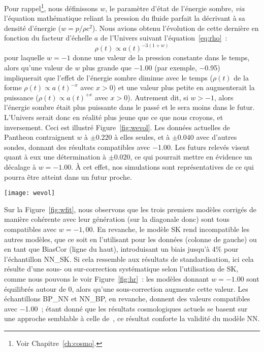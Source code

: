 \documentclass[../main/main.tex]{subfiles}
\begin{document}
Pour rappel\footnote{Voir Chapitre~\ref{ch:cosmo}.}, nous définissons $w$, le
paramètre d'état de l'énergie sombre, \textit{via} l'équation mathématique
reliant la pression du fluide parfait la décrivant à sa densité d'énergie ($w =
p/\rho c^2$). Nous avions obtenu l'évolution de cette dernière en fonction du
facteur d'échelle $a$ de l'Univers suivant l'équation~\ref{eq:rho}~:
\begin{equation}
    \rho(t) \propto a(t)^{-3(1+w)}
\end{equation}
pour laquelle $w = -1$ donne une valeur de la pression constante dans le temps,
alors qu'une valeur de $w$ plus grande que \num{-1.00} (par exemple,
\num{-0.95}) impliquerait que l'effet de l'énergie sombre diminue avec le temps
($\rho(t)$ de la forme $\rho(t) \propto a(t)^{-x}$ avec $x > 0$) et une valeur
plus petite en augmenterait la puissance ($\rho(t) \propto a(t)^{+x}$ avec $x >
0$). Autrement dit, si $w > -1$, alors l'énergie sombre était plus puissante
dans le passé et le sera moins dans le futur. L'Univers serait donc en réalité
plus jeune que ce que nous croyons, et inversement. Ceci est illustré
Figure~\ref{fig:wevol}. Les données actuelles de Pantheon \citep{scolnic2018}
contraignent $w$ à $\pm \num{0.220}$ à elles seules, et à $\pm \num{0.040}$ avec
d'autres sondes, donnant des résultats compatibles avec \num{-1.00}. Les futurs
relevés visent quant à eux une détermination à $\pm \num{0.020}$, ce qui
pourrait mettre en évidence un décalage à $w = \num{-1.00}$. À cet effet, nos
simulations sont représentatives de ce qui pourra être atteint dans un futur
proche.

\begin{SCfigure}[1]
    \centering
    \texttt{[image: wevol]}
    \caption[Effet d'une variation de $w$ sur le facteur d'échelle de
    l'Univers]{Effet d'une variation de $w$ sur le facteur d'échelle de
    l'Univers. Une valeur $< -1$ (par exemple, \num{-1.1}) ferait que l'Univers
est plus âgé que ce que nous croyons, et inversement.}
    \label{fig:wevol}
\end{SCfigure}

Sur la Figure~\ref{fig:wfit}, nous observons que les trois premiers modèles
corrigés de manière cohérente avec leur génération (sur la diagonale donc) sont
tous compatibles avec $w = -1,00$. En revanche, le modèle SK rend incompatible
les autres modèles, que ce soit en l'utilisant pour les données (colonne de
gauche) ou en tant que BiasCor (ligne du haut), introduisant un biais jusqu'à
4\% pour l'échantillon NN\_SK. Si cela ressemble aux résultats de
standardisation, ici cela résulte d'une sous- ou sur-correction systématique
selon l'utilisation de SK, comme nous pouvons le voir Figure~\ref{fig:hr}~: les
modèles donnant $w = \num{-1.00}$ sont équilibrés autour de 0, alors qu'une
sous-correction augmente cette valeur. Les échantillons BP\_NN et NN\_BP, en
revanche, donnent des valeurs compatibles avec \num{-1.00}~; étant donné que les
résultats cosmologiques actuels se basent sur une approche semblable à celle
de~, ce résultat conforte la validité du modèle NN.
\end{document}
